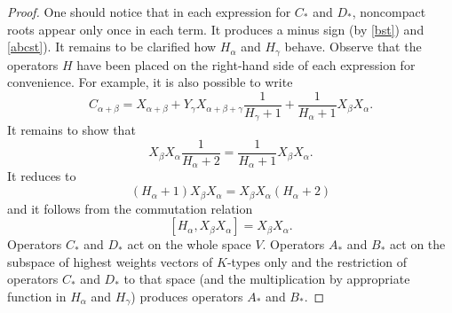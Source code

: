 \documentclass[twoside,a4paper,12pt]{article}
\theoremstyle{definition}
\begin{document}
\begin{proof}
	One should notice that in each expression for $C_*$ and $D_*$, noncompact
	roots appear only once in each term. It produces a minus sign
	(by \eqref{bst}) and \eqref{abcst}).
	It remains to be clarified how $H_\alpha$ and $H_\gamma$ behave.
	Observe that the operators $H$ have been placed on the right-hand side of
	each expression for convenience. For example, it is also possible to write
	\begin{equation*}
		C_{\alpha+\beta}=X_{\alpha+\beta}
			+Y_\gamma X_{\alpha+\beta+\gamma}\frac1{H_\gamma+1}
			+\frac1{H_\alpha+1}X_\beta X_\alpha.
	\end{equation*}
	It remains to show that
	\begin{equation}\label{mult}
		X_\beta X_\alpha\frac1{H_\alpha+2}=\frac1{H_\alpha+1}X_\beta X_\alpha.
	\end{equation}
	It reduces to
	\begin{equation*}
		(H_\alpha+1)X_\beta X_\alpha=X_\beta X_\alpha(H_\alpha+2)
	\end{equation*}
	and it follows from the commutation relation
	\[ [H_\alpha,X_\beta X_\alpha]=X_\beta X_\alpha. \]
	Operators $C_*$ and $D_*$ act on the whole space $V$. Operators $A_*$ and
	$B_*$ act on the subspace of highest weights vectors of $K$-types only and
	the restriction of operators $C_*$ and $D_*$ to that space (and the multiplication by appropriate function in $H_\alpha$ and $H_\gamma$)
	produces operators $A_*$ and $B_*$.
\end{proof}
\end{document}
